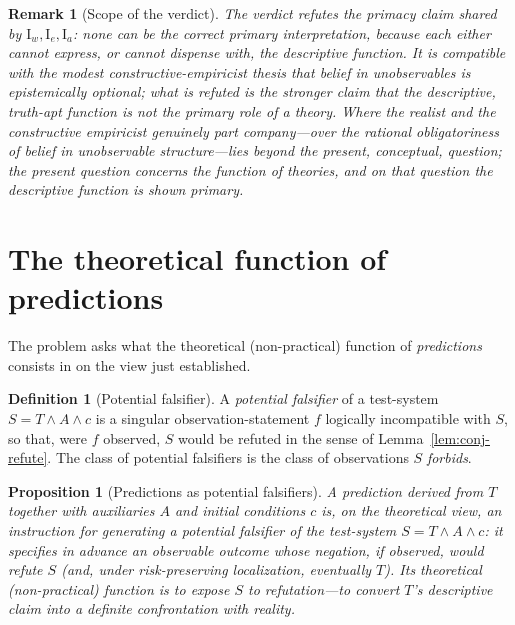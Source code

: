 \documentclass{amsart}
\theoremstyle{definition}
\newtheorem{definition}{Definition}
\theoremstyle{plain}
\newtheorem{proposition}{Proposition}
\newtheorem{remark}{Remark}
\begin{document}
\begin{remark}[Scope of the verdict]\label{rem:scope}
The verdict refutes the \emph{primacy} claim shared by $\mathrm I_w,\mathrm
I_e,\mathrm I_a$: none can be the correct primary interpretation, because each
either cannot express, or cannot dispense with, the descriptive function. It is
compatible with the modest constructive-empiricist thesis that \emph{belief} in
unobservables is epistemically optional; what is refuted is the stronger claim
that the descriptive, truth-apt function is not the \emph{primary} role of a
theory. Where the realist and the constructive empiricist genuinely part
company---over the \emph{rational obligatoriness} of belief in unobservable
structure---lies beyond the present, conceptual, question; the present question
concerns the \emph{function} of theories, and on that question the descriptive
function is shown primary.
\end{remark}

\section{The theoretical function of predictions}

The problem asks what the theoretical (non-practical) function of
\emph{predictions} consists in on the view just established.

\begin{definition}[Potential falsifier]\label{def:falsifier}
A \emph{potential falsifier} of a test-system $S=T\wedge A\wedge c$ is a
singular observation-statement $f$ logically incompatible with $S$, so that,
were $f$ observed, $S$ would be refuted in the sense of
Lemma~\ref{lem:conj-refute}. The class of potential falsifiers is the class of
observations $S$ \emph{forbids}.
\end{definition}

\begin{proposition}[Predictions as potential
falsifiers]\label{prop:pred-falsifier}
A prediction derived from $T$ together with auxiliaries $A$ and initial
conditions $c$ is, on the theoretical view, an instruction for generating a
potential falsifier of the test-system $S=T\wedge A\wedge c$: it specifies in
advance an observable outcome whose negation, if observed, would refute $S$
(and, under risk-preserving localization, eventually $T$). Its theoretical
(non-practical) function is to \emph{expose $S$ to refutation}---to convert
$T$'s descriptive claim into a definite confrontation with reality.
\end{proposition}
\end{document}
